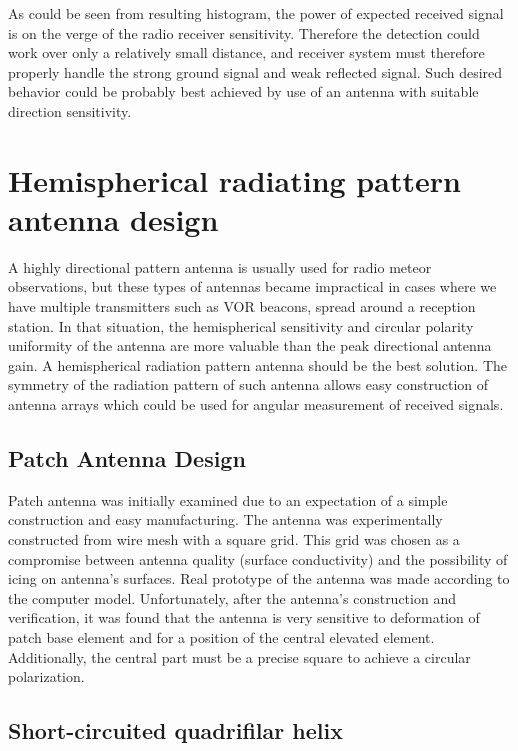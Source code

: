 \documentclass[twoside]{ctuthesis}
\theoremstyle{plain}
\theoremstyle{definition}
\theoremstyle{note}
\begin{document}
As could be seen from resulting histogram, the power of expected received signal is on the verge of the radio receiver sensitivity. Therefore the detection could work over only a relatively small distance, and receiver system must therefore properly handle the strong ground signal and weak reflected signal. Such desired behavior could be probably best achieved by use of an antenna with suitable direction sensitivity.

\section{Hemispherical radiating pattern antenna design}

A highly directional pattern antenna is usually used for radio meteor observations, but these types of antennas became impractical in cases where we have multiple transmitters such as VOR beacons, spread around a reception station. In that situation, the hemispherical sensitivity and circular polarity uniformity of the antenna are more valuable than the peak directional antenna gain. A hemispherical radiation pattern antenna should be the best solution.  The symmetry of the radiation pattern of such antenna allows easy construction of antenna arrays which could be used for angular measurement of received signals.

\subsection{Patch Antenna Design }

Patch antenna was initially examined due to an expectation of a simple construction and easy manufacturing. The antenna was experimentally constructed from wire mesh with a square grid. This grid was chosen as a compromise between antenna quality (surface conductivity)  and the possibility of icing on antenna’s surfaces. Real prototype of the antenna was made according to the computer model. Unfortunately, after the antenna’s construction and verification, it was found that the antenna is very sensitive to deformation of patch base element and for a position of the central elevated element. Additionally, the central part must be a precise square to achieve a circular polarization. 

\subsection{Short-circuited quadrifilar helix}
\end{document}
